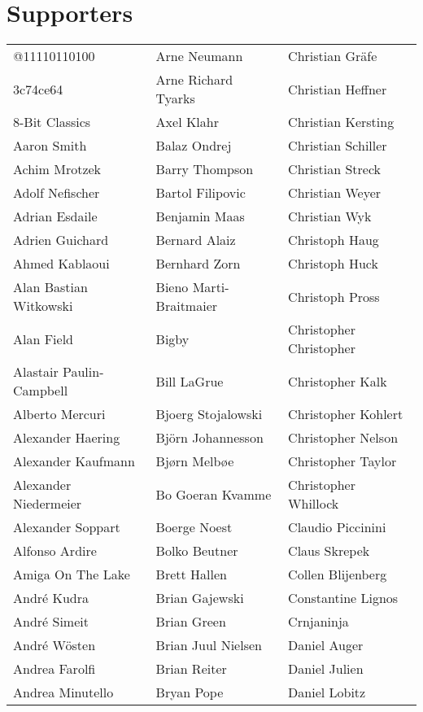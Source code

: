 \newpage
\section{Supporters}

\begin{small}
\setlength{\tabcolsep}{1mm}
\begin{tabular}{p{4cm}p{4cm}p{4cm}}
@11110110100 & Arne Neumann & Christian Gräfe \\
3c74ce64 & Arne Richard Tyarks & Christian Heffner \\
8-Bit Classics & Axel Klahr & Christian Kersting \\
Aaron Smith & Balaz Ondrej & Christian Schiller \\
Achim Mrotzek & Barry Thompson & Christian Streck \\
Adolf Nefischer & Bartol Filipovic & Christian Weyer \\
Adrian Esdaile & Benjamin Maas & Christian Wyk \\
Adrien Guichard & Bernard Alaiz & Christoph Haug \\
Ahmed Kablaoui & Bernhard Zorn & Christoph Huck \\
Alan Bastian Witkowski & Bieno Marti-Braitmaier & Christoph Pross \\
Alan Field & Bigby & Christopher Christopher \\
Alastair Paulin-Campbell & Bill LaGrue & Christopher Kalk \\
Alberto Mercuri & Bjoerg Stojalowski & Christopher Kohlert \\
Alexander Haering & Björn Johannesson & Christopher Nelson \\
Alexander Kaufmann & Bjørn Melbøe & Christopher Taylor \\
Alexander Niedermeier & Bo Goeran Kvamme & Christopher Whillock \\
Alexander Soppart & Boerge Noest & Claudio Piccinini \\
Alfonso Ardire & Bolko Beutner & Claus Skrepek \\
Amiga On The Lake & Brett Hallen & Collen Blijenberg \\
André Kudra & Brian Gajewski & Constantine Lignos \\
André Simeit & Brian Green & Crnjaninja \\
André Wösten & Brian Juul Nielsen & Daniel Auger \\
Andrea Farolfi & Brian Reiter & Daniel Julien \\
Andrea Minutello & Bryan Pope & Daniel Lobitz \\

\end{tabular}
\end{small}
